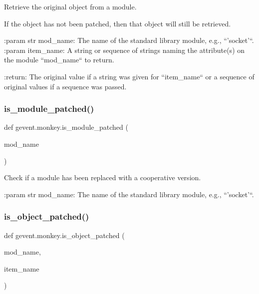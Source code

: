 \begin{DoxyVerb}Retrieve the original object from a module.

If the object has not been patched, then that object will still be
retrieved.

:param str mod_name: The name of the standard library module,
    e.g., ``'socket'``.
:param item_name: A string or sequence of strings naming the
    attribute(s) on the module ``mod_name`` to return.

:return: The original value if a string was given for
         ``item_name`` or a sequence of original values if a
         sequence was passed.
\end{DoxyVerb}
 \mbox{\label{namespacegevent_1_1monkey_aaaa4854f7592d3709914701abaf3049c}} 
\subsubsection{\texorpdfstring{is\+\_\+module\+\_\+patched()}{is\_module\_patched()}}
{\footnotesize\ttfamily def gevent.\+monkey.\+is\+\_\+module\+\_\+patched (\begin{DoxyParamCaption}\item[{}]{mod\+\_\+name }\end{DoxyParamCaption})}

\begin{DoxyVerb}Check if a module has been replaced with a cooperative version.

:param str mod_name: The name of the standard library module,
    e.g., ``'socket'``.\end{DoxyVerb}
 \mbox{\label{namespacegevent_1_1monkey_a0fa2edf73aebcd8f4ce9d2f90fdb7156}} 
\subsubsection{\texorpdfstring{is\+\_\+object\+\_\+patched()}{is\_object\_patched()}}
{\footnotesize\ttfamily def gevent.\+monkey.\+is\+\_\+object\+\_\+patched (\begin{DoxyParamCaption}\item[{}]{mod\+\_\+name,  }\item[{}]{item\+\_\+name }\end{DoxyParamCaption})}

